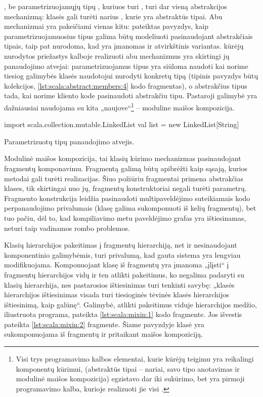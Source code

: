 , be parametrizuojamųjų tipų , kuriuos
turi , turi dar vieną abstrakcijos mechanizmą:
 klasės gali turėti narius , kurie
yra abstraktūs tipai. Abu mechanizmai yra pakeičiami vienas kitu:
\cite[10]{scala-overview} pateiktas pavyzdys, kaip parametrizuojamuosius
tipus galima būtų modeliuoti pasinaudojant abstrakčiais tipais, taip
pat nurodoma, kad yra įmanomas ir atvirkštinis variantas.
 kūrėjų \cite[11]{scala-overview} nurodytos
priežastys kalboje realizuoti abu mechanizmus yra skirtingi jų
panaudojimo atvejai: parametrizuojamus tipus yra siūloma naudoti kai
norime tiesiog galimybės klasės naudotojui nurodyti konkretų tipą
(tipinis pavyzdys būtų kolekcijos, \ref{lst:scala:abstract:members:4}
kodo fragmentas), o abstrakčius tipus tada, kai norime kliento kode
pasinaudoti abstrakčiu tipu. Pastaroji galimybė yra dažniausiai
naudojama su kita  „naujove“\footnote{
Visi trys programavimo kalbos elementai, kurie 
kūrėjų teigimu yra reikalingi komponentų kūrimui, (abstraktūs
tipai – nariai, savo tipo anotavimas ir modulinė maišos kompozicija)
egzistavo dar iki  sukūrimo, bet 
yra pirmoji programavimo kalba, kurioje realizuoti jie visi
\cite[2]{scalable-component-abstractions}.} – moduline maišos
kompozicija.

\begin{listing}[h]
  \begin{scalacode}
    import scala.collection.mutable.LinkedList
    val list = new LinkedList[String]
  \end{scalacode}
  \caption{Parametrizuotų tipų panaudojimo atvejis.}
  \label{lst:scala:abstract:members:4}
\end{listing}

Modulinė maišos kompozicija, tai klasių kūrimo mechanizmas
pasinaudojant fragmentų  komponavimu. Fragmentą galimą
būtų apibrėžti kaip sąsają, kurios metodai gali turėti
realizacijas. Šiuo požiūriu fragmentai primena abstrakčias klases,
tik skirtingai nuo jų, fragmentų konstruktoriai negali turėti
parametrų. Fragmento konstrukcija leidžia pasinaudoti
multipaveldėjimo suteikiamais kodo perpanaudojimo privalumais
(klasę galima sukomponuoti iš kelių fragmentų), bet tuo pačiu, dėl
to, kad kompiliavimo metu paveldėjimo grafas yra ištiesinamas, neturi
taip vadinamos rombo problemos.

Klasių hierarchijos pakeitimas į fragmentų hierarchiją, net ir
nesinaudojant komponentinio galimybėmis, turi privalumą, kad
gauta sistema yra lengviau modifikuojama. Komponuojant klasę iš
fragmentų yra įmanoma „įlįsti“ į fragmentų hierarchijos vidų
ir ten atlikti pakeitimus, ko negalima padaryti su klasių hierarchija,
nes pastarosios ištiesinimas turi tenkinti savybę: „klasės hierarchijos
ištiesinimas visada turi tiesioginės tėvinės klasės hierarchijos
ištiesinimą, kaip galūnę“\cite[57p.]{scala-reference}. Galimybė,
atlikti pakeitimus viduje hierarchijos medžio, iliustruota programa,
pateikta \ref{lst:scala:mixin:1} kodo fragmente. Jos išvestis pateikta
\ref{lst:scala:mixin:2} fragmente. Šiame pavyzdyje klasė 
yra sukomponuojama iš fragmentų  ir  pritaikant
maišos kompoziciją.

